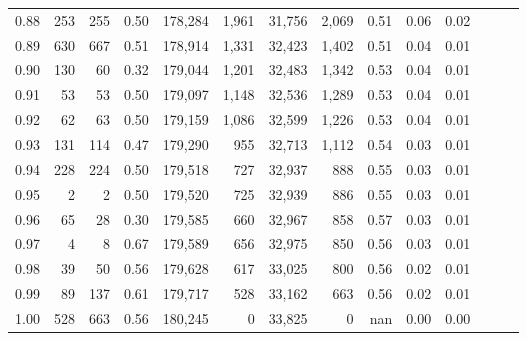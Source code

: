 \begin{tabular}{rrrrrrrrrrrrrr}
0.88 &     253 &    255 &  0.50 &  178,284 &    1,961 &  31,756 &   2,069 &  0.51 &  0.06 &      0.02 \\
0.89 &     630 &    667 &  0.51 &  178,914 &    1,331 &  32,423 &   1,402 &  0.51 &  0.04 &      0.01 \\
0.90 &     130 &     60 &  0.32 &  179,044 &    1,201 &  32,483 &   1,342 &  0.53 &  0.04 &      0.01 \\
0.91 &      53 &     53 &  0.50 &  179,097 &    1,148 &  32,536 &   1,289 &  0.53 &  0.04 &      0.01 \\
0.92 &      62 &     63 &  0.50 &  179,159 &    1,086 &  32,599 &   1,226 &  0.53 &  0.04 &      0.01 \\
0.93 &     131 &    114 &  0.47 &  179,290 &      955 &  32,713 &   1,112 &  0.54 &  0.03 &      0.01 \\
0.94 &     228 &    224 &  0.50 &  179,518 &      727 &  32,937 &     888 &  0.55 &  0.03 &      0.01 \\
0.95 &       2 &      2 &  0.50 &  179,520 &      725 &  32,939 &     886 &  0.55 &  0.03 &      0.01 \\
0.96 &      65 &     28 &  0.30 &  179,585 &      660 &  32,967 &     858 &  0.57 &  0.03 &      0.01 \\
0.97 &       4 &      8 &  0.67 &  179,589 &      656 &  32,975 &     850 &  0.56 &  0.03 &      0.01 \\
0.98 &      39 &     50 &  0.56 &  179,628 &      617 &  33,025 &     800 &  0.56 &  0.02 &      0.01 \\
0.99 &      89 &    137 &  0.61 &  179,717 &      528 &  33,162 &     663 &  0.56 &  0.02 &      0.01 \\
1.00 &     528 &    663 &  0.56 &  180,245 &        0 &  33,825 &       0 &   nan &  0.00 &      0.00 \\
\bottomrule
\end{tabular}
